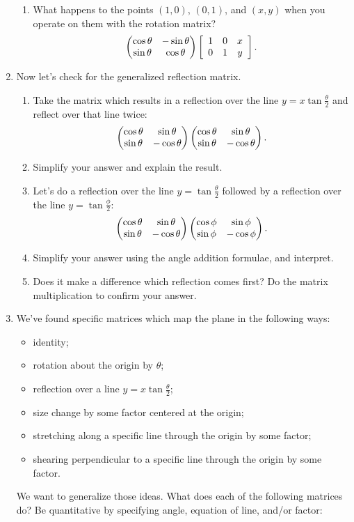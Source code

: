 \documentclass[../gatm_answers.tex]{subfiles}
\begin{document}
\begin{enumerate}
\begin{enumerate}
\item What happens to the points $(1,0)$, $(0,1)$, and $(x,y)$ when you operate on them with the rotation matrix? $$\begin{pmatrix} \cos \theta & -\sin \theta \\ \sin\theta & \cos\theta \end{pmatrix}\left[\begin{array}{ccc} 1 & 0 & x \\ 0 & 1 & y \end{array}\right].$$
\end{enumerate}
\item Now let's check for the generalized reflection matrix.
\begin{enumerate}
\item Take the matrix which results in a reflection over the line $y=x\tan \frac{\theta}{2}$ and reflect over that line twice: $$\begin{pmatrix} \cos\theta & \sin\theta \\ \sin\theta & -\cos\theta \end{pmatrix}\begin{pmatrix} \cos\theta & \sin\theta \\ \sin\theta & -\cos\theta \end{pmatrix}.$$
\item Simplify your answer and explain the result.
\item Let's do a reflection over the line $y=\tan\frac{\theta}{2}$ followed by a reflection over the line $y=\tan\frac{\phi}{2}$:
$$\begin{pmatrix} \cos\theta & \sin\theta \\ \sin\theta & -\cos\theta \end{pmatrix}\begin{pmatrix} \cos\phi & \sin\phi \\ \sin\phi & -\cos\phi \end{pmatrix}.$$
\item Simplify your answer using the angle addition formulae, and interpret.
\item Does it make a difference which reflection comes first? Do the matrix multiplication to confirm your answer.
\end{enumerate}
\item We've found specific matrices which map the plane in the following ways:
\begin{itemize}
\item identity;
\item rotation about the origin by $\theta$;
\item reflection over a line $y=x \tan\frac{\theta}{2}$;
\item size change by some factor centered at the origin;
\item stretching along a specific line through the origin by some factor;
\item shearing perpendicular to a specific line through the origin by some factor.
\end{itemize}
We want to generalize those ideas. What does each of the following matrices do? Be quantitative by specifying angle, equation of line, and/or factor:\label{prob:list_transformations}
\begin{multicols}{3}

\end{multicols}
\end{enumerate}
\end{document}
